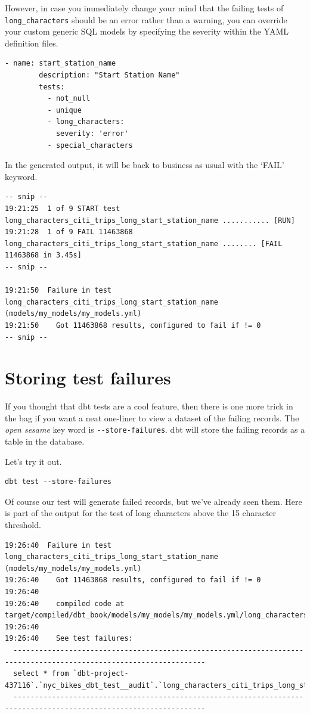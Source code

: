 \documentclass[
]{book}
\begin{document}
However, in case you immediately change your mind that the failing tests of \texttt{long\_characters} should be an error rather than a warning, you can override your custom generic SQL models by specifying the severity within the YAML definition files.

\begin{verbatim}
- name: start_station_name
        description: "Start Station Name"
        tests:
          - not_null
          - unique
          - long_characters:
            severity: 'error'
          - special_characters
\end{verbatim}

In the generated output, it will be back to business as usual with the `FAIL' keyword.

\begin{verbatim}
-- snip -- 
19:21:25  1 of 9 START test long_characters_citi_trips_long_start_station_name ........... [RUN]
19:21:28  1 of 9 FAIL 11463868 long_characters_citi_trips_long_start_station_name ........ [FAIL 11463868 in 3.45s]
-- snip --

19:21:50  Failure in test long_characters_citi_trips_long_start_station_name (models/my_models/my_models.yml)
19:21:50    Got 11463868 results, configured to fail if != 0
-- snip --
\end{verbatim}

\hypertarget{storing-test-failures}{%
\section{Storing test failures}\label{storing-test-failures}}

If you thought that dbt tests are a cool feature, then there is one more trick in the bag if you want a neat one-liner to view a dataset of the failing records. The \emph{open sesame} key word is \texttt{-\/-store-failures}. dbt will store the failing records as a table in the database.

Let's try it out.

\begin{verbatim}
dbt test --store-failures
\end{verbatim}

Of course our test will generate failed records, but we've already seen them. Here is part of the output for the test of long characters above the 15 character threshold.

\begin{verbatim}
19:26:40  Failure in test long_characters_citi_trips_long_start_station_name (models/my_models/my_models.yml)
19:26:40    Got 11463868 results, configured to fail if != 0
19:26:40  
19:26:40    compiled code at target/compiled/dbt_book/models/my_models/my_models.yml/long_characters_citi_trips_long_start_station_name.sql
19:26:40  
19:26:40    See test failures:
  -------------------------------------------------------------------------------------------------------------------
  select * from `dbt-project-437116`.`nyc_bikes_dbt_test__audit`.`long_characters_citi_trips_long_start_station_name`
  -------------------------------------------------------------------------------------------------------------------
\end{verbatim}
\end{document}
